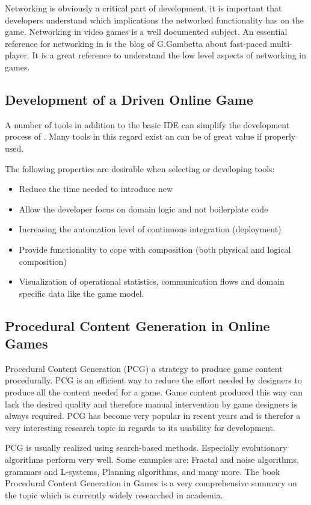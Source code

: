 Networking is obviously a critical part of \og{} development. it is important
that developers understand which implications the networked functionality has
on the game. Networking in video games is a well documented subject. An
essential reference for networking in \ogs{} is the blog of G.Gambetta\cite{}
about fast-paced multi-player. It is a great reference to understand the low
level aspects of networking in games.


\subsection{Development of a \ms{} Driven Online Game}

A number of tools in addition to the basic IDE can simplify the development
process of \ms{}. Many tools in this regard exist an can be of great value if
properly used. 

The following properties are desirable when selecting or developing tools:

\begin{itemize}
  \item Reduce the time needed to introduce new \mss{}
  \item Allow the developer focus on domain logic and not boilerplate code
  \item Increasing the automation level of continuous integration (deployment)
  \item Provide functionality to cope with \mss{} composition (both physical
  and logical composition)
  \item Visualization of operational statistics, communication flows and domain
  specific data like the game model.
\end{itemize}

\subsection{Procedural Content Generation in Online Games}

Procedural Content Generation (PCG) a strategy to produce game content
procedurally. PCG is an efficient way to reduce the effort needed by designers
to produce all the content needed for a game. Game content produced this way can
lack the desired quality and therefore manual intervention by game designers is
always required. PCG has become very popular in recent years
\cite{lee2014procedural} and is therefor a very interesting research topic in
regards to its usability for \og{} development.

PCG is usually realized using search-based methods. Especially evolutionary
algorithms perform very well. Some examples are: Fractal and noise algorithms,
grammars and L-systems, Planning algorithms, and many more. The book Procedural
Content Generation in Games \cite{shaker2014procedural} is a very comprehensive
summary on the topic which is currently widely researched in academia.
